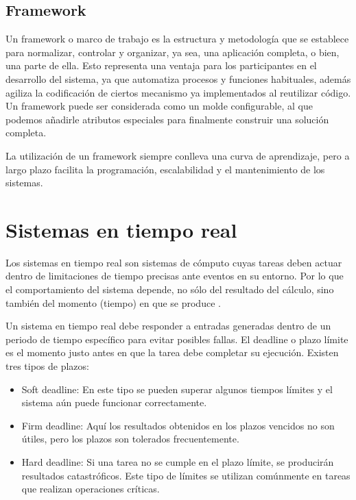      \subsection{Framework}
Un framework o marco de trabajo es la estructura y metodología que se establece para normalizar, controlar y organizar, ya sea, una aplicación completa, o bien, una parte de ella. 
Esto representa una ventaja para los participantes en el desarrollo del sistema, ya que automatiza procesos y funciones habituales, además agiliza la codificación de ciertos mecanismo ya implementados al reutilizar código.
Un framework puede ser considerada como un molde configurable, al que podemos añadirle atributos especiales para finalmente construir una solución completa.
\newline

La utilización de un framework siempre conlleva una curva de aprendizaje, pero a largo plazo facilita la programación, escalabilidad y el mantenimiento de los sistemas.
		
    \section{Sistemas en tiempo real}\label{sec:sistr}

    Los sistemas en tiempo real son sistemas de cómputo cuyas tareas deben actuar dentro de limitaciones de tiempo precisas ante eventos en su entorno. Por lo que el comportamiento del sistema depende, no sólo del resultado del cálculo, sino también del momento (tiempo) en que se produce \cite{Buta2011}.
    \newline 
    
    Un sistema en tiempo real debe  responder a entradas generadas dentro de un periodo de tiempo específico para evitar posibles fallas. El deadline o plazo límite es el momento justo antes en que la tarea debe completar su ejecución. Existen tres tipos de plazos: 
\begin{itemize}
\item Soft deadline: En este tipo se pueden superar algunos tiempos límites y el sistema aún puede funcionar correctamente.
\item Firm deadline: Aquí los resultados obtenidos en los plazos vencidos no son útiles, pero los plazos son tolerados frecuentemente.
\item Hard deadline: Si una tarea no se cumple en el plazo límite, se producirán resultados catastróficos. Este tipo de límites se utilizan comúnmente en tareas que realizan operaciones críticas.
\end{itemize}   

